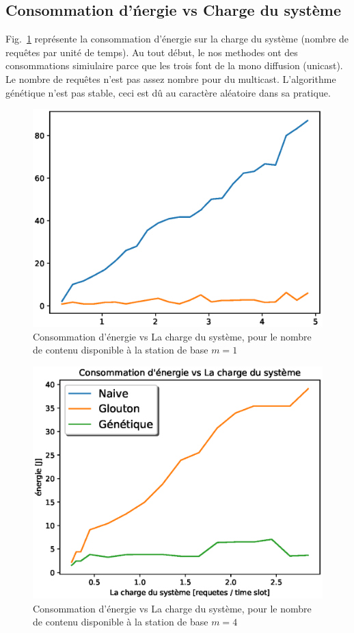 \documentclass[runningheads]{llncs}
\begin{document}
\subsection{Consommation d'\'nergie vs Charge du syst\`eme}
Fig.~\ref{fig:evslm4} repr\'esente la consommation d'énergie sur 
la charge du système (nombre de requêtes par unit\'e de temps).
Au tout début, le nos methodes ont des consommations simiulaire parce que les
trois font de la mono diffusion (unicast). Le nombre de requêtes n'est pas 
assez nombre pour du multicast.
L'algorithme g\'en\'etique n'est pas stable, ceci est dû au caract\`ere 
aléatoire dans sa pratique.
\begin{figure}[H]
    
    \includegraphics[width=\textwidth]{EvsL1.eps}
    \caption{Consommation d'énergie vs La charge du système, pour 
    le nombre de contenu disponible \`a la station de base $m=1$} \label{fig1}
    \label{fig:evslm4}
\end{figure}

\begin{figure}[H]
    \includegraphics[width=\textwidth]{EvsL4.eps}
    \caption{Consommation d'énergie vs La charge du système, pour 
    le nombre de contenu disponible \`a la station de base $m=4$} \label{fig1}
\end{figure}
\end{document}
